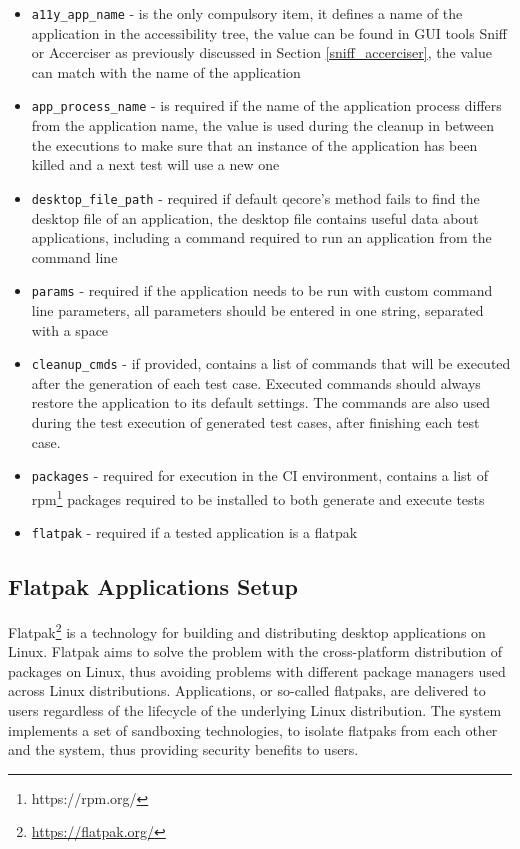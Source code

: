 \begin{itemize}
    \item \texttt{a11y\_app\_name} - is the only compulsory item, it defines a name of the application in the accessibility tree, the value can be found in GUI tools Sniff or Accerciser as previously discussed in Section \ref{sniff_accerciser}, the value can match with the name of the application
     \item \texttt{app\_process\_name} - is required if the name of the application process differs from the application name, the value is used during the cleanup in between the executions to make sure that an instance of the application has been killed and a next test will use a new one
     \item \texttt{desktop\_file\_path} - required if default qecore's method fails to find the desktop file of an application, the desktop file contains useful data about applications, including a command required to run an application from the command line
     \item \texttt{params} - required if the application needs to be run with custom command line parameters, all parameters should be entered in one string, separated with a space
     \item \texttt{cleanup\_cmds} - if provided, contains a list of commands that will be executed after the generation of each test case. Executed commands should always restore the application to its default settings. The commands are also used during the test execution of generated test cases, after finishing each test case. 
     \item \texttt{packages} - required for execution in the CI environment, contains a list of rpm\footnote{https://rpm.org/} packages required to be installed to both generate and execute tests
     \item \texttt{flatpak} - required if a tested application is a flatpak
\end{itemize}

\subsection{Flatpak Applications Setup}
Flatpak\footnote{\url{https://flatpak.org/}} is a technology for building and distributing desktop applications on Linux. Flatpak aims to solve the problem with the cross-platform distribution of packages on Linux, thus avoiding problems with different package managers used across Linux distributions. Applications, or so-called flatpaks, are delivered to users regardless of the lifecycle of the underlying Linux distribution. The system implements a set of sandboxing technologies, to isolate flatpaks from each other and the system, thus providing security benefits to users.\cite{flatpak}

